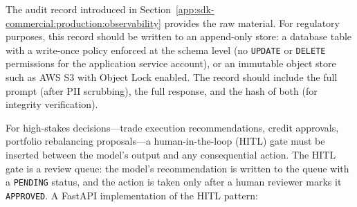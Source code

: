 The audit record introduced in Section~\ref{app:sdk-commercial:production:observability}
provides the raw material. For regulatory purposes, this record should be written to an
append-only store: a database table with a write-once policy enforced at the schema
level (no \texttt{UPDATE} or \texttt{DELETE} permissions for the application service
account), or an immutable object store such as AWS S3 with Object Lock enabled. The
record should include the full prompt (after PII scrubbing), the full response, and the
hash of both (for integrity verification).

For high-stakes decisions---trade execution recommendations, credit approvals,
portfolio rebalancing proposals---a human-in-the-loop (HITL) gate must be inserted
between the model's output and any consequential action. The HITL gate is a review
queue: the model's recommendation is written to the queue with a \texttt{PENDING}
status, and the action is taken only after a human reviewer marks it \texttt{APPROVED}.
A FastAPI implementation of the HITL pattern:

